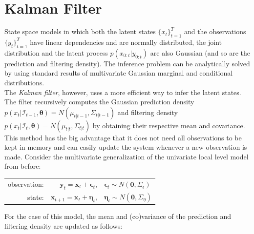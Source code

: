\documentclass[11pt, oneside]{scrreprt}   	%
\begin{document}
\section{Kalman Filter}
State space models in which both the latent states $\{x_t\}_{t=1}^T$ and the observations $\{y_t\}_{t=1}^T$ have linear dependencies and are normally distributed, the joint distribution and the latent process $p(x_{0:t} | y_{0:t})$ are also Gaussian (and so are the prediction and filtering density). 
The inference problem can be analytically solved by using standard results of multivariate Gaussian marginal and conditional distributions.\\

The \textit{Kalman filter}, however, uses a more efficient way to infer the latent states. 
The filter recursively computes the Gaussian prediction density $p(x_{t} | \mathcal{I}_{t-1}, \boldsymbol{\theta}) = N(\mu_{t | t-1}, \Sigma_{t | t-1})$ and filtering density $p(x_{t} | \mathcal{I}_{t}, \boldsymbol{\theta}) = N(\mu_{t | t}, \Sigma_{t | t})$ by obtaining their respective mean and covariance. 
This method has the big advantage that it does not need all observations to be kept in memory and can easily update the system whenever a new observation is made.
Consider the multivariate generalization of the univariate local level model from before:
\bigskip
\begin{center}
\begin{tabular}{ r r l }
  observation: & $\boldsymbol{y}_t = \boldsymbol{x}_t + \boldsymbol{\epsilon}_t$, & $\boldsymbol{\epsilon}_t \sim N(\textbf{0}, \Sigma_{\epsilon})$ \\
  state: & $\boldsymbol{x}_{t+1} = \boldsymbol{x}_t + \boldsymbol{\eta}_t$, & $\boldsymbol{\eta}_t \sim N(\textbf{0}, \Sigma_{\eta})$ \\
\end{tabular}
\end{center}
\bigskip
For the case of this model, the mean and (co)variance of the prediction and filtering density are updated as follows:
\end{document}
